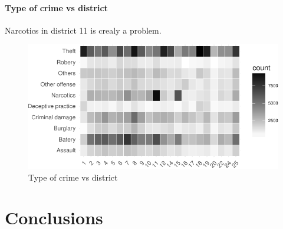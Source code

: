 \documentclass[]{article}
\let\oldparagraph\paragraph
\renewcommand{\paragraph}[1]{\oldparagraph{#1}\mbox{}}
\begin{document}
\paragraph{Type of crime vs district}\label{type-of-crime-vs-district}

Narcotics in district 11 is crealy a problem.

\begin{figure}[htbp]
\centering
\includegraphics{Assessment_1v6_files/figure-latex/fig10-1.pdf}
\caption{Type of crime vs district}
\end{figure}

\section{Conclusions}\label{conclusions}
\end{document}
